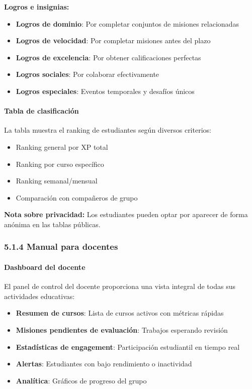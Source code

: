 \textbf{Logros e insignias:}

\begin{itemize}
	\item \textbf{Logros de dominio}: Por completar conjuntos de misiones relacionadas
	\item \textbf{Logros de velocidad}: Por completar misiones antes del plazo
	\item \textbf{Logros de excelencia}: Por obtener calificaciones perfectas
	\item \textbf{Logros sociales}: Por colaborar efectivamente
	\item \textbf{Logros especiales}: Eventos temporales y desafíos únicos
\end{itemize}

\paragraph{Tabla de clasificación}

La tabla muestra el ranking de estudiantes según diversos criterios:

\begin{itemize}
	\item Ranking general por XP total
	\item Ranking por curso específico
	\item Ranking semanal/mensual
	\item Comparación con compañeros de grupo
\end{itemize}

\textbf{Nota sobre privacidad:} Los estudiantes pueden optar por aparecer de forma anónima en las tablas públicas.

\subsubsection{5.1.4 Manual para docentes}

\paragraph{Dashboard del docente}

El panel de control del docente proporciona una vista integral de todas sus actividades educativas:

\begin{itemize}
	\item \textbf{Resumen de cursos}: Lista de cursos activos con métricas rápidas
	\item \textbf{Misiones pendientes de evaluación}: Trabajos esperando revisión
	\item \textbf{Estadísticas de engagement}: Participación estudiantil en tiempo real
	\item \textbf{Alertas}: Estudiantes con bajo rendimiento o inactividad
	\item \textbf{Analítica}: Gráficos de progreso del grupo
\end{itemize}


